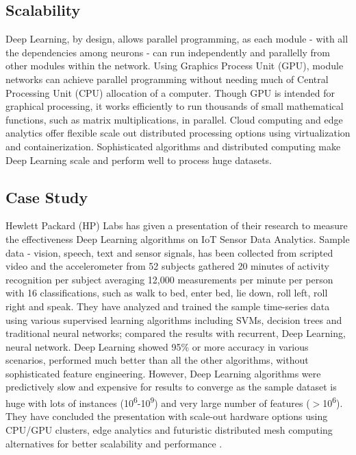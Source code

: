 \documentclass[sigconf]{acmart}
\begin{document}
	\subsection{Scalability}
	
	Deep Learning, by design, allows parallel programming, as each module - with all the dependencies among neurons - can run independently and parallelly from other modules within the network. Using Graphics Process Unit (GPU), module networks can achieve parallel programming without needing much of Central Processing Unit (CPU) allocation of a computer. Though GPU is intended for graphical processing, it works efficiently to run thousands of small mathematical functions, such as matrix multiplications, in parallel. Cloud computing and edge analytics offer flexible scale out distributed processing options using virtualization and containerization. Sophisticated algorithms and distributed computing make Deep Learning scale and perform well to process huge datasets. 
	
	\subsection{Case Study}
	
	Hewlett Packard (HP) Labs has given a presentation of their research to measure the effectiveness Deep Learning algorithms on IoT Sensor Data Analytics. Sample data - vision, speech, text and sensor signals, has been collected from scripted video and the accelerometer from 52 subjects gathered 20 minutes of activity recognition per subject averaging 12,000 measurements per minute per person with 16 classifications, such as walk to bed, enter bed, lie down, roll left, roll right and speak. They have analyzed and trained the sample time-series data using various supervised learning algorithms including SVMs, decision trees and traditional neural networks; compared the results with recurrent, Deep Learning, neural network. Deep Learning showed 95\% or more accuracy in various scenarios, performed much better than all the other algorithms, without sophisticated feature engineering. However, Deep Learning algorithms were predictively slow and expensive for results to converge as the sample dataset is huge with lots of instances (10\textsuperscript{6}-10\textsuperscript{9}) and very large number of features ($>$10\textsuperscript{6}). They have concluded the presentation with scale-out hardware options using CPU/GPU clusters, edge analytics and futuristic distributed mesh computing alternatives for better scalability and performance \cite{Vassilieva2016}. 
			
\end{document}
